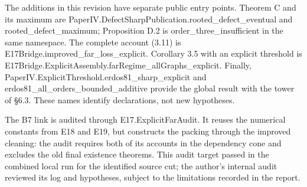 \documentclass[english,11pt,a4paper]{article}
\begin{document}
The additions in this revision have separate public entry points. Theorem C and its maximum are {\ttfamily\small PaperIV.\discretionary{\hbox{\ensuremath{\hookrightarrow}}}{}{}DefectSharpP\discretionary{\hbox{\ensuremath{\hookrightarrow}}}{}{}ublication.\discretionary{\hbox{\ensuremath{\hookrightarrow}}}{}{}rooted\_\discretionary{\hbox{\ensuremath{\hookrightarrow}}}{}{}defect\_\discretionary{\hbox{\ensuremath{\hookrightarrow}}}{}{}eventual} and {\ttfamily\small rooted\_\discretionary{\hbox{\ensuremath{\hookrightarrow}}}{}{}defect\_\discretionary{\hbox{\ensuremath{\hookrightarrow}}}{}{}maximum}; Proposition D.2 is {\ttfamily\small order\_\discretionary{\hbox{\ensuremath{\hookrightarrow}}}{}{}three\_\discretionary{\hbox{\ensuremath{\hookrightarrow}}}{}{}insufficient} in the same namespace. The complete account (3.11) is {\ttfamily\small E17Bridge.\discretionary{\hbox{\ensuremath{\hookrightarrow}}}{}{}improved\_\discretionary{\hbox{\ensuremath{\hookrightarrow}}}{}{}far\_\discretionary{\hbox{\ensuremath{\hookrightarrow}}}{}{}loss\_\discretionary{\hbox{\ensuremath{\hookrightarrow}}}{}{}explicit}. Corollary 3.5 with an explicit threshold is {\ttfamily\small E17Bridge.\discretionary{\hbox{\ensuremath{\hookrightarrow}}}{}{}ExplicitAsse\discretionary{\hbox{\ensuremath{\hookrightarrow}}}{}{}mbly.\discretionary{\hbox{\ensuremath{\hookrightarrow}}}{}{}farRegime\_\discretionary{\hbox{\ensuremath{\hookrightarrow}}}{}{}allGraphs\_\discretionary{\hbox{\ensuremath{\hookrightarrow}}}{}{}explicit}. Finally, {\ttfamily\small PaperIV.\discretionary{\hbox{\ensuremath{\hookrightarrow}}}{}{}ExplicitThre\discretionary{\hbox{\ensuremath{\hookrightarrow}}}{}{}shold.\discretionary{\hbox{\ensuremath{\hookrightarrow}}}{}{}erdos81\_\discretionary{\hbox{\ensuremath{\hookrightarrow}}}{}{}sharp\_\discretionary{\hbox{\ensuremath{\hookrightarrow}}}{}{}explicit} and {\ttfamily\small erdos81\_\discretionary{\hbox{\ensuremath{\hookrightarrow}}}{}{}all\_\discretionary{\hbox{\ensuremath{\hookrightarrow}}}{}{}orders\_\discretionary{\hbox{\ensuremath{\hookrightarrow}}}{}{}bounded\_\discretionary{\hbox{\ensuremath{\hookrightarrow}}}{}{}additive} provide the global result with the tower of §6.3. These names identify declarations, not new hypotheses.

The B7 link is audited through {\ttfamily\small E17.\discretionary{\hbox{\ensuremath{\hookrightarrow}}}{}{}ExplicitFarA\discretionary{\hbox{\ensuremath{\hookrightarrow}}}{}{}udit}. It reuses the numerical constants from {\ttfamily\small E18} and {\ttfamily\small E19}, but constructs the packing through the improved cleaning: the audit requires both of its accounts in the dependency cone and excludes the old final existence theorems. This audit target passed in the combined local run for the identified source cut; the author's internal audit reviewed its log and hypotheses, subject to the limitations recorded in the report.
\end{document}
